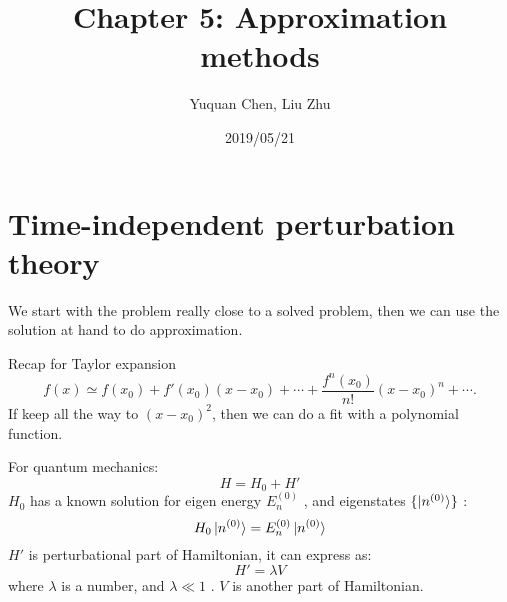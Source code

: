 \documentclass[UTF8,12pt]{article} %
\begin{document}
\title{Chapter 5: Approximation methods}
\author{Yuquan Chen, Liu Zhu}
\date{2019/05/21} %
\maketitle

\section{Time-independent perturbation theory}

We start with the problem really close to a solved problem, then we can use the solution at hand to do approximation. 

\begin{myboxes}{Recap for Taylor expansion}{}
\begin{equation}
   f(x)\simeq f(x_0)+f'(x_0)(x-x_0)+\cdots+\frac{f^n(x_0)}{n!}(x-x_0)^n+\cdots . 
\end{equation}
If keep all the way to $(x-x_0)^2$, then we can do a fit with a polynomial function.
\end{myboxes}

For quantum mechanics:
\begin{equation}
    H=H_{0} + H'
\end{equation}
$H_0$ has a known solution for eigen energy $E^{(0)}_{n}$ , and eigenstates $\{\ket{n^{(0)}}\}$ :
\begin{equation}
    H_0\ket{n^{(0)}}=E^{(0)}_n\ket{n^{(0)}}
\end{equation}
$H'$ is perturbational part of Hamiltonian, it can express as:
\begin{equation}
    H'=\lambda V
\end{equation}
where $\lambda$ is a number, and $\lambda\ll1$ . $V$ is another part of Hamiltonian.
\end{document}
